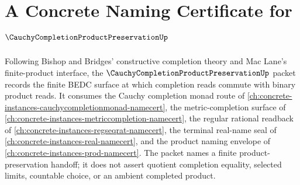 \chapter{A Concrete Naming Certificate for $\CauchyCompletionProductPreservationUp$}
\label{ch:concrete-instances-cauchy-completion-product-preservation-namecert}

Following Bishop and Bridges' constructive completion theory and Mac Lane's finite-product interface, the $\CauchyCompletionProductPreservationUp$ packet records the finite BEDC surface at which completion reads commute with binary product reads. It consumes the Cauchy completion monad route of \autoref{ch:concrete-instances-cauchycompletionmonad-namecert}, the metric-completion surface of \autoref{ch:concrete-instances-metriccompletion-namecert}, the regular rational readback of \autoref{ch:concrete-instances-regseqrat-namecert}, the terminal real-name seal of \autoref{ch:concrete-instances-real-namecert}, and the product naming envelope of \autoref{ch:concrete-instances-prod-namecert}. The packet names a finite product-preservation handoff; it does not assert quotient completion equality, selected limits, countable choice, or an ambient completed product.

